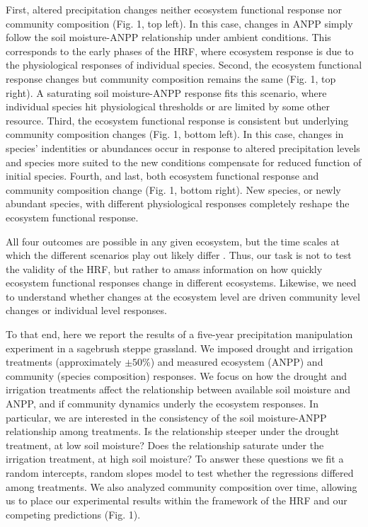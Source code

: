 \documentclass[fleqn,10pt,lineno]{wlpeerj} %
\begin{document}
First, altered precipitation changes neither ecosystem functional
response nor community composition (Fig. 1, top left). In this case,
changes in ANPP simply follow the soil moisture-ANPP relationship under
ambient conditions. This corresponds to the early phases of the HRF,
where ecosystem response is due to the physiological responses of
individual species. Second, the ecosystem functional response changes
but community composition remains the same (Fig. 1, top right). A
saturating soil moisture-ANPP response fits this scenario, where
individual species hit physiological thresholds or are limited by some
other resource. Third, the ecosystem functional response is consistent
but underlying community composition changes (Fig. 1, bottom left). In
this case, changes in species' indentities or abundances occur in
response to altered precipitation levels and species more suited to the
new conditions compensate for reduced function of initial species.
Fourth, and last, both ecosystem functional response and community
composition change (Fig. 1, bottom right). New species, or newly
abundant species, with different physiological responses completely
reshape the ecosystem functional response.

All four outcomes are possible in any given ecosystem, but the time
scales at which the different scenarios play out likely differ
\citep{Smith2009, Wilcox2016, Knapp2017}. Thus, our task is not to test
the validity of the HRF, but rather to amass information on how quickly
ecosystem functional responses change in different ecosystems. Likewise,
we need to understand whether changes at the ecosystem level are driven
community level changes or individual level responses.

To that end, here we report the results of a five-year precipitation
manipulation experiment in a sagebrush steppe grassland. We imposed
drought and irrigation treatments (approximately \(\pm50\%\)) and
measured ecosystem (ANPP) and community (species composition) responses.
We focus on how the drought and irrigation treatments affect the
relationship between available soil moisture and ANPP, and if community
dynamics underly the ecosystem responses. In particular, we are
interested in the consistency of the soil moisture-ANPP relationship
among treatments. Is the relationship steeper under the drought
treatment, at low soil moisture? Does the relationship saturate under
the irrigation treatment, at high soil moisture? To answer these
questions we fit a random intercepts, random slopes model to test
whether the regressions differed among treatments. We also analyzed
community composition over time, allowing us to place our experimental
results within the framework of the HRF and our competing predictions
(Fig. 1).
\end{document}
